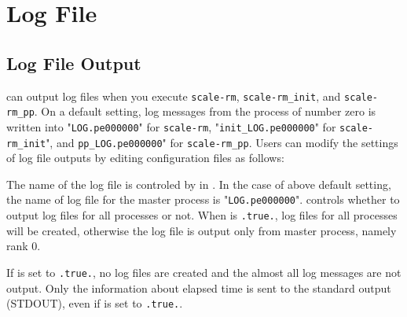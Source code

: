 \section{Log File} \label{sec:log}


\subsection{Log File Output}

\scalerm can output log files when you execute \verb|scale-rm|, \verb|scale-rm_init|, and \verb|scale-rm_pp|.
On a default setting, log messages from the process of number zero is written into "\verb|LOG.pe000000|" for \verb|scale-rm|, "\verb|init_LOG.pe000000|" for \verb|scale-rm_init|", and \verb|pp_LOG.pe000000|" for \verb|scale-rm_pp|.
Users can modify the settings of log file outputs by editing configuration files as follows:


The name of the log file is controled by  in .
In the case of above default setting, the name of log file for the master process is "\verb|LOG.pe000000|".
 controls whether to output log files for all processes or not.
When  is \verb|.true.|, log files for all processes will be created, otherwise the log file is output only from master process, namely rank 0.

If  is set to \verb|.true.|, no log files are created and the almost all log messages are not output.
Only the information about elapsed time is sent to the standard output (STDOUT), even if  is set to \verb|.true.|.

